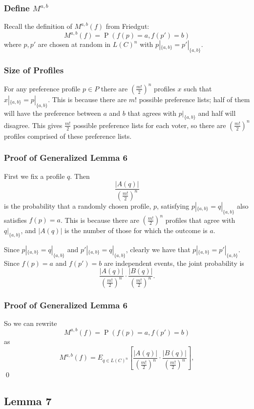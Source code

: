 \documentclass[aspectratio=169]{beamer}
\DeclareMathOperator{\probability}{P}
\begin{document}
		\begin{frame}
			\frametitle{Define $M^{a,b}$}

			Recall the definition of $M^{a,b}(f)$ from Friedgut:
			\[
				M^{a,b}(f) = \probability(f(p) = a, f(p') = b)
			\]
			where $p, p'$ are chosen at random in $L(C)^n$ with $p|_{\{a,b\}} = p'|_{\{a,b\}}$.
		\end{frame}

		\begin{frame}
			\frametitle{Size of Profiles}

			For any preference profile $p \in P$ there are $(\frac{m!}{2})^n$ profiles $x$ such that $x|_{\{a, b\}} = p|_{\{a, b\}}$. This is because there are $m!$ possible preference lists; half of them will have the preference between $a$ and $b$ that agrees with $p|_{\{a, b\}}$ and half will disagree. This gives $\frac{m!}{2}$ possible preference lists for each voter, so there are $(\frac{m!}{2})^n$ profiles comprised of these preference lists.
		\end{frame}

		\begin{frame}
			\frametitle{Proof of Generalized Lemma 6}

			First we fix a profile $q$. Then
			\[
				\frac{|A(q)|}{\left(\frac{m!}{2}\right)^n}
			\]
			is the probability that a randomly chosen profile, $p$, satisfying $p|_{\{a,b\}} = q|_{\{a,b\}}$ also satisfies $f(p) = a$. This is because there are $(\frac{m!}{2})^n$ profiles that agree with $q|_{\{a,b\}}$, and $|A(q)|$ is the number of those for which the outcome is $a$.

			Since $p|_{\{a,b\}} = q|_{\{a,b\}}$ and $p'|_{\{a,b\}} = q|_{\{a,b\}}$, clearly we have that $p|_{\{a,b\}} = p'|_{\{a,b\}}$. Since $f(p) = a$ and $f(p') = b$ are independent events, the joint probability is
			\[
				\frac{|A(q)|}{\left(\frac{m!}{2}\right)^n} \cdot \frac{|B(q)|}{\left(\frac{m!}{2}\right)^n}.
			\]
		\end{frame}

		\begin{frame}
			\frametitle{Proof of Generalized Lemma 6}

			So we can rewrite
			\[
				M^{a,b}(f) = \probability(f(p) = a, f(p') = b)
			\]
			as
			\[
				M^{a,b}(f) = E_{q \in L(C)^n} \left[ \frac{|A(q)|}{\left(\frac{m!}{2}\right)^n} \cdot \frac{|B(q)|}{\left(\frac{m!}{2}\right)^n} \right],
			\]
			\qed
		\end{frame}


	\subsection{Lemma 7}
\end{document}
